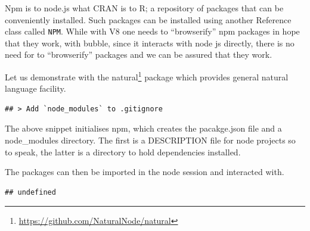 \documentclass[
]{krantz}
\makeatletter
\newenvironment{Shaded}{\begin{snugshade}}{\end{snugshade}}
\newcommand{\CommentTok}[1]{\textcolor[rgb]{0.37,0.37,0.37}{\textit{#1}}}
\newcommand{\KeywordTok}[1]{\textcolor[rgb]{0.27,0.27,0.27}{\textbf{#1}}}
\newcommand{\NormalTok}[1]{#1}
\newcommand{\OperatorTok}[1]{\textcolor[rgb]{0.43,0.43,0.43}{\textbf{#1}}}
\newcommand{\StringTok}[1]{\textcolor[rgb]{0.5,0.5,0.5}{#1}}
\renewcommand{\href}[2]{#2\footnote{\url{#1}}}
\newenvironment{kframe}{%
\medskip{}
\setlength{\fboxsep}{.8em}
 \def\at@end@of@kframe{}%
 \ifinner\ifhmode%
  \def\at@end@of@kframe{\end{minipage}}%
  \begin{minipage}{\columnwidth}%
 \fi\fi%
 \def\FrameCommand##1{\hskip\@totalleftmargin \hskip-\fboxsep
 \colorbox{shadecolor}{##1}\hskip-\fboxsep
     \hskip-\linewidth \hskip-\@totalleftmargin \hskip\columnwidth}%
 \MakeFramed {\advance\hsize-\width
   \@totalleftmargin\z@ \linewidth\hsize
   \@setminipage}}%
 {\par\unskip\endMakeFramed%
 \at@end@of@kframe}
\renewenvironment{Shaded}{\begin{kframe}}{\end{kframe}}
\makeatother
\begin{document}
Npm is to node.js what CRAN is to R; a repository of packages that can be conveniently installed. Such packages can be installed using another Reference class called \texttt{NPM}. While with V8 one needs to ``browserify'' npm packages in hope that they work, with bubble, since it interacts with node js directly, there is no need for to ``browserify'' packages and we can be assured that they work.

Let us demonstrate with the \href{https://github.com/NaturalNode/natural}{natural} package which provides general natural language facility.

\begin{Shaded}
\end{Shaded}

\begin{verbatim}
## > Add `node_modules` to .gitignore
\end{verbatim}

The above snippet initialises npm, which creates the pacakge.json file and a node\_modules directory. The first is a DESCRIPTION file for node projects so to speak, the latter is a directory to hold dependencies installed.

The packages can then be imported in the node session and interacted with.

\begin{Shaded}
\end{Shaded}

\begin{verbatim}
## undefined
\end{verbatim}

\begin{Shaded}
\end{Shaded}
\end{document}
